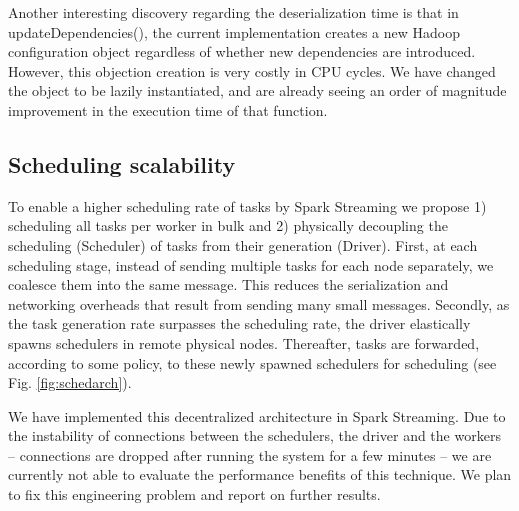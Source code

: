 Another interesting discovery regarding the deserialization time is that in updateDependencies(), the current implementation creates a new Hadoop configuration object regardless of whether new dependencies are introduced. However, this objection creation is very costly in CPU cycles. We have changed the object to be lazily instantiated, and are already seeing an order of magnitude improvement in the execution time of that function.


\subsection{Scheduling scalability}


To enable a higher scheduling rate of tasks by Spark Streaming we propose 1) scheduling all tasks per worker in bulk and 2) physically decoupling the scheduling (Scheduler) of tasks from their generation (Driver).
First, at each scheduling stage, instead of sending multiple tasks for each node separately, we coalesce them into the same message. This reduces the serialization and networking overheads that result from sending many small messages.
Secondly, as the task generation rate surpasses the scheduling rate, the driver elastically spawns schedulers in remote physical nodes. Thereafter, tasks are forwarded, according to some policy, to these newly spawned schedulers for scheduling (see Fig. \ref{fig:schedarch}). 

We have implemented this decentralized architecture in Spark Streaming. Due to the instability of connections between the schedulers, the driver and the workers -- connections are dropped after running the system for a few minutes -- we are currently not able to evaluate the performance benefits of this technique. We plan to fix this engineering problem and report on further results.
